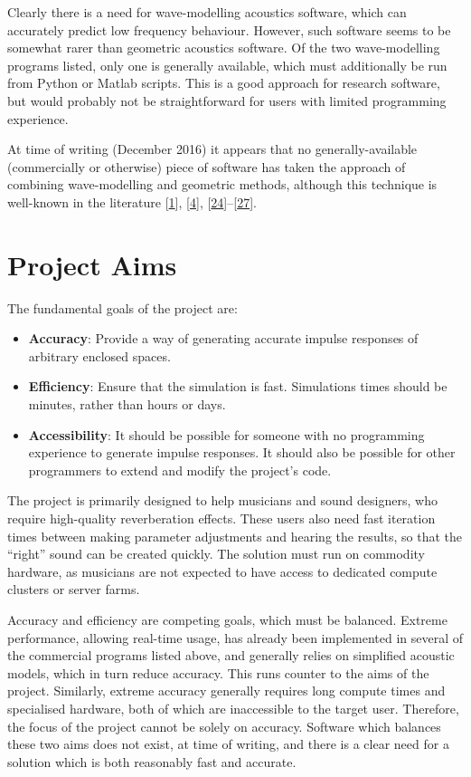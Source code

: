 \documentclass[]{scrreprt}
\providecommand{\tightlist}{%
  \setlength{\itemsep}{0pt}\setlength{\parskip}{0pt}}
\begin{document}
Clearly there is a need for wave-modelling acoustics software, which can
accurately predict low frequency behaviour. However, such software seems
to be somewhat rarer than geometric acoustics software. Of the two
wave-modelling programs listed, only one is generally available, which
must additionally be run from Python or Matlab scripts. This is a good
approach for research software, but would probably not be
straightforward for users with limited programming experience.

At time of writing (December 2016) it appears that no
generally-available (commercially or otherwise) piece of software has
taken the approach of combining wave-modelling and geometric methods,
although this technique is well-known in the literature
{[}\protect\hyperlink{ref-southernux5fspatialux5f2011}{1}{]},
{[}\protect\hyperlink{ref-aretzux5fcombinedux5f2009}{4}{]},
{[}\protect\hyperlink{ref-southernux5fhybridux5f2013}{24}{]}--{[}\protect\hyperlink{ref-vorlanderux5fsimulationux5f2009}{27}{]}.

\section{Project Aims}\label{project-aims}

The fundamental goals of the project are:

\begin{itemize}
\tightlist
\item
  \textbf{Accuracy}: Provide a way of generating accurate impulse
  responses of arbitrary enclosed spaces.
\item
  \textbf{Efficiency}: Ensure that the simulation is fast. Simulations
  times should be minutes, rather than hours or days.
\item
  \textbf{Accessibility}: It should be possible for someone with no
  programming experience to generate impulse responses. It should also
  be possible for other programmers to extend and modify the project's
  code.
\end{itemize}

The project is primarily designed to help musicians and sound designers,
who require high-quality reverberation effects. These users also need
fast iteration times between making parameter adjustments and hearing
the results, so that the ``right'' sound can be created quickly. The
solution must run on commodity hardware, as musicians are not expected
to have access to dedicated compute clusters or server farms.

Accuracy and efficiency are competing goals, which must be balanced.
Extreme performance, allowing real-time usage, has already been
implemented in several of the commercial programs listed above, and
generally relies on simplified acoustic models, which in turn reduce
accuracy. This runs counter to the aims of the project. Similarly,
extreme accuracy generally requires long compute times and specialised
hardware, both of which are inaccessible to the target user. Therefore,
the focus of the project cannot be solely on accuracy. Software which
balances these two aims does not exist, at time of writing, and there is
a clear need for a solution which is both reasonably fast and accurate.
\end{document}
